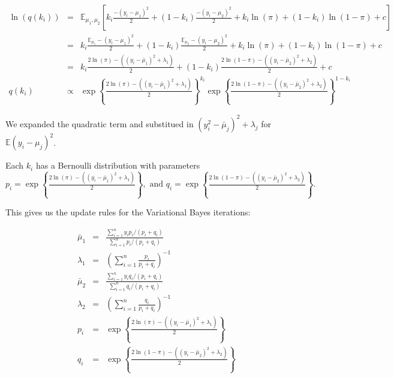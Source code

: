 \documentclass[12pt]{article}
\begin{document}
\begin{eqnarray*}
\ln(q(k_i)) & = & \mathbb{E}_{\mu_1, \mu_2} \left[ k_{i} \frac{-(y_i-\mu_1)^2}{2} + (1-k_{i}) \frac{-(y_i-\mu_2)^2}{2} + k_i \ln(\pi) + (1-k_i) \ln(1-\pi) + c \right]\\
& = & k_i\frac{\mathbb{E}_{\mu_1} -(y_i-\mu_1)^2}{2}  + (1-k_i) \frac{\mathbb{E}_{\mu_2} -(y_i-\mu_2)^2}{2}  + k_i \ln(\pi) + (1-k_i) \ln(1-\pi) + c \\
& = & k_i \frac{2\ln(\pi)-((y_i - \bar{\mu}_1)^2 + \lambda_1)}{2} + (1-k_i) \frac{2\ln(1-\pi)-((y_i - \bar{\mu}_2)^2 + \lambda_2)}{2} + c\\
q(k_i) & \propto & \exp \left\{\frac{2\ln(\pi)-((y_i - \bar{\mu}_1)^2 + \lambda_1)}{2} \right\}^{k_i} \exp \left\{\frac{2\ln(1-\pi)-((y_i - \bar{\mu}_2)^2 + \lambda_2)}{2} \right\}^{1-k_i}
\end{eqnarray*}

We expanded the quadratic term and substitued in $(y_i^2 - \bar{\mu}_j)^2 + \lambda_j$ for $\mathbb{E} (y_i-\mu_j)^2$.

Each $k_i$ has a Bernoulli distribution with parameters $p_i = \exp \left\{\frac{2\ln(\pi)-((y_i - \bar{\mu}_1)^2 + \lambda_1)}{2} \right\}, \mbox{ and } q_i = \exp \left\{\frac{2\ln(1-\pi)-((y_i - \bar{\mu}_2)^2 + \lambda_2)}{2} \right\}.$

This gives us the update rules for the Variational Bayes iterations:

\begin{eqnarray*}
\bar{\mu}_1 & = &  \frac{\sum_{i=1}^{n} y_i p_i /(p_i+q_i)}{\sum_{i=1}^{n} p_i /(p_i+q_i)} \\
\lambda_1 & = & \left(\sum_{i=1}^{n} \frac{p_i}{p_i+q_i}\right)^{-1} \\
\bar{\mu}_2 & = &  \frac{\sum_{i=1}^{n} y_i q_i /(p_i+q_i)}{\sum_{i=1}^{n} q_i /(p_i+q_i)} \\
\lambda_2 & = & \left(\sum_{i=1}^{n} \frac{q_i}{p_i+q_i}\right)^{-1} \\
p_i & = & \exp \left\{\frac{2\ln(\pi)-((y_i - \bar{\mu}_1)^2 + \lambda_1)}{2} \right\} \\
q_i & = & \exp \left\{\frac{2\ln(1-\pi)-((y_i - \bar{\mu}_2)^2 + \lambda_2)}{2} \right\}
\end{eqnarray*}
\end{document}
